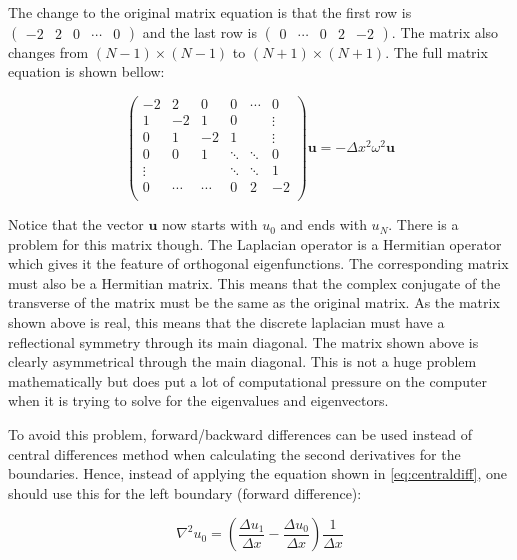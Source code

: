 The change to the original matrix equation is that the first row is $\begin{pmatrix}-2&2&0&\cdots&0\end{pmatrix}$ and the last row is $\begin{pmatrix}0&\cdots&0&2&-2\end{pmatrix}$. The matrix also changes from $(N-1)\times(N-1)$ to $(N+1)\times(N+1)$. The full matrix equation is shown bellow:

\begin{equation}
\begin{pmatrix}
    -2    &     2&     0&     0&\cdots&      0\\
    1     &    -2&     1&     0&      & \vdots\\
    0     &     1&    -2&     1&      & \vdots\\
    0     &     0&     1&\ddots&\ddots&      0\\
    \vdots&      &      &\ddots&\ddots&      1\\
    0     &\cdots&\cdots&     0&     2&     -2\\
\end{pmatrix}
\mathbf{u} = -\Delta x^2 \omega^2 \mathbf{u}
\end{equation}

Notice that the vector $\mathbf{u}$ now starts with $u_0$ and ends with $u_N$. There is a problem for this matrix though. The Laplacian operator is a Hermitian operator \autocite{axler2015linear} which gives it the feature of orthogonal eigenfunctions. The corresponding matrix must also be a Hermitian matrix\autocite{horn2013matrix}. This means that the complex conjugate of the transverse of the matrix must be the same as the original matrix. As the matrix shown above is real, this means that the discrete laplacian must have a reflectional symmetry through its main diagonal. The matrix shown above is clearly asymmetrical through the main diagonal. This is not a huge problem mathematically but does put a lot of computational pressure on the computer when it is trying to solve for the eigenvalues and eigenvectors.

To avoid this problem, forward/backward differences can be used instead of central differences method when calculating the second derivatives for the boundaries. Hence, instead of applying the equation shown in \eqref{eq:centraldiff}, one should use this for the left boundary (forward difference): 

\begin{equation}
    \nabla^2 u_0 = (\frac{\Delta u_1}{\Delta x} - \frac{\Delta u_0}{\Delta x})\frac{1}{\Delta x}
\end{equation}

